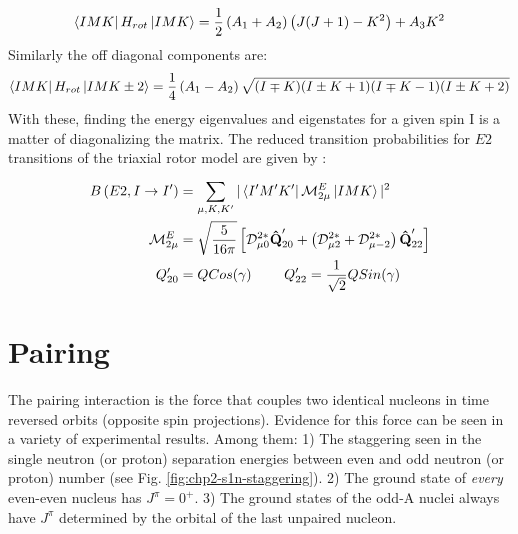 \begin{equation}
\label{eqn:chp2-triaxial-diagonal-hamil}
\Bra{IMK}H_{rot}\Ket{IMK}=\frac{1}{2}\left(A_1+A_2\right)\left(J(J+1)-K^2\right) + A_3K^2
\end{equation}
Similarly the off diagonal components are:
\begin{equation}
\label{eqn:chp2-triaxial-offdiagonal-hamil}
\Bra{IMK}H_{rot}\Ket{IMK\pm{}2}=\frac{1}{4}\left(A_1-A_2\right)\sqrt{(I\mp{}K)(I\pm{}K+1)(I\mp{}K-1)(I\pm{}K+2)}
\end{equation}
With these, finding the energy eigenvalues and eigenstates for a given spin I is a matter of diagonalizing the matrix. The reduced transition probabilities for $E2$ transitions of the triaxial rotor model are given by \cite{wobblingGeometry}:
\begin{align}
\label{eqn:chp2-triaxial-rotor-reduced-transitions}
B\left(E2,I\rightarrow{}I'\right) &=\sum\limits_{\mu{},K,K'}^{}|\Bra{I'M'K'}\mathcal{M}^E_{2\mu}\Ket{IMK}|^2\\
\mathcal{M}^E_{2\mu} &= \sqrt{\frac{5}{16\pi}}\left[\mathcal{D}^{2*}_{\mu{}0}\boldsymbol{\hat{\textbf{Q}}}'_{20}+\left(\mathcal{D}^{2*}_{\mu{}2}+\mathcal{D}^{2*}_{\mu{}-2}\right)\boldsymbol{\hat{\textbf{Q}}}'_{22}\right] \nonumber\\
Q'_{20} &= Q Cos(\gamma) ~~~~~~~ Q'_{22} = \frac{1}{\sqrt{2}}Q Sin(\gamma) \nonumber
\end{align}

\section{Pairing}
The pairing interaction is the force that couples two identical nucleons in time reversed orbits (opposite spin projections). Evidence for this force can be seen in a variety of experimental results. Among them: 1) The staggering seen in the single neutron (or proton) separation energies between even and odd neutron (or proton) number (see Fig. \ref{fig:chp2-s1n-staggering}). 2) The ground state of \emph{every} even-even nucleus has $J^{\pi}=0^+$. 3) The ground states of the odd-A nuclei always have $J^{\pi}$ determined by the orbital of the last unpaired nucleon.


